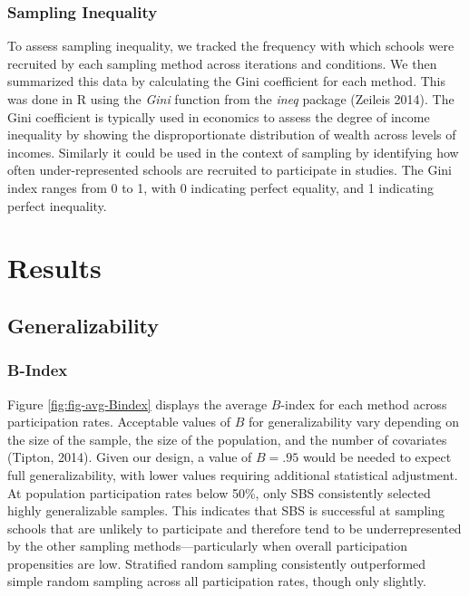 \documentclass[man,floatsintext]{apa6}
\begin{document}
\hypertarget{sampling-inequality}{%
\subsubsection{Sampling Inequality}\label{sampling-inequality}}

To assess sampling inequality, we tracked the frequency with which schools were recruited by each sampling method across iterations and conditions. We then summarized this data by calculating the Gini coefficient for each method. This was done in R using the \emph{Gini} function from the \emph{ineq} package (Zeileis 2014). The Gini coefficient is typically used in economics to assess the degree of income inequality by showing the disproportionate distribution of wealth across levels of incomes. Similarly it could be used in the context of sampling by identifying how often under-represented schools are recruited to participate in studies. The Gini index ranges from 0 to 1, with 0 indicating perfect equality, and 1 indicating perfect inequality.

\hypertarget{results}{%
\section{Results}\label{results}}

\hypertarget{generalizability-1}{%
\subsection{Generalizability}\label{generalizability-1}}

\hypertarget{b-index}{%
\subsubsection{B-Index}\label{b-index}}

Figure \ref{fig:fig-avg-Bindex} displays the average \(B\)-index for each method across participation rates. Acceptable values of \(B\) for generalizability vary depending on the size of the sample, the size of the population, and the number of covariates (Tipton, 2014). Given our design, a value of \(B = .95\) would be needed to expect full generalizability, with lower values requiring additional statistical adjustment. At population participation rates below 50\%, only SBS consistently selected highly generalizable samples. This indicates that SBS is successful at sampling schools that are unlikely to participate and therefore tend to be underrepresented by the other sampling methods---particularly when overall participation propensities are low. Stratified random sampling consistently outperformed simple random sampling across all participation rates, though only slightly.
\end{document}
